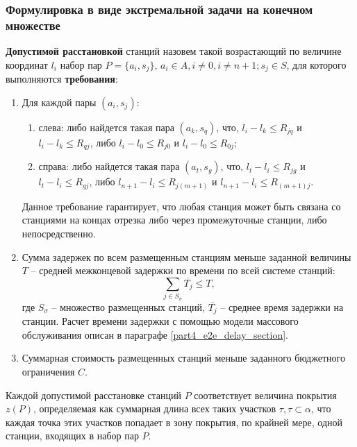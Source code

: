 \subsubsection{Формулировка в виде экстремальной задачи на конечном множестве}

\textbf{Допустимой расстановкой} станций назовем такой возрастающий по величине координат $l_i$  набор пар $P = \{a_i, s_j\}, \, a_i \in A,i \neq 0,i \neq n+1;s_j \in S$, для которого выполняются \textbf{требования}:

\begin{enumerate}
  \item  Для каждой пары $(a_i,s_j)$:
      \begin{enumerate}
          \item слева: либо найдется такая пара $(a_k,s_q)$, что, $l_i - l_k \leqslant R_{jq}$  и $l_i - l_k  \leqslant R_{qj}$, либо $l_i-l_0 \leqslant R_{j0}$ и $l_i - l_0 \leqslant R_{0j}$;
          \item справа: либо найдется такая пара $(a_t,s_g)$, что, $l_t-l_i \leqslant R_{jg}$ и $l_t - l_i \leqslant R_{gj}$, либо $l_{n+1}-l_i \leqslant R_{j(m+1)}$ и $l_{n+1}-l_i \leqslant R_{(m+1)j}$. 
\end{enumerate}
Данное требование гарантирует, что любая станция может быть связана со станциями на концах отрезка либо через промежуточные станции, либо непосредственно.
  \item Сумма задержек по всем размещенным станциям меньше заданной величины $T$ – средней межконцевой задержки по времени по всей системе станций:
  \begin{displaymath}
      \label{eq:part3_e2e_delay}
      \sum\limits_{j \in S_\sigma} \overline{T_j} \leqslant T,
  \end{displaymath}
где $S_\sigma$ – множество размещенных станций, $\overline{T_j}$ -- среднее время задержки на станции. Расчет времени задержки с помощью модели массового обслуживания описан в параграфе \cref{part4_e2e_delay_section}.
  \item Суммарная стоимость размещенных станций меньше заданного бюджетного ограничения  $C$.
\end{enumerate}


Каждой допустимой расстановке станций $P$ соответствует величина покрытия $z(P)$, определяемая как суммарная длина всех таких участков $\tau,\tau \subset \alpha$, что каждая точка этих 
участков попадает в зону покрытия, по крайней мере, одной станции, входящих в набор пар $P$.


